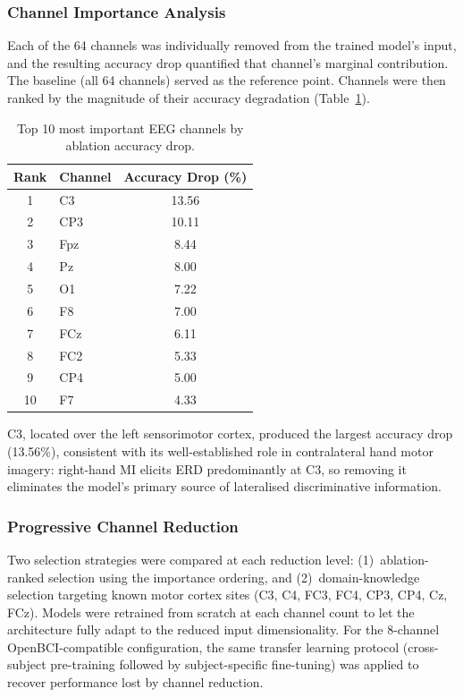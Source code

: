 \documentclass[12pt, a4paper]{article}
\begin{document}
\subsubsection{Channel Importance Analysis}

Each of the 64 channels was individually removed from the trained model's input, and the resulting accuracy drop quantified that channel's marginal contribution. The baseline (all 64 channels) served as the reference point. Channels were then ranked by the magnitude of their accuracy degradation (Table~\ref{tab:channel_importance}).

\begin{table}[htbp]
\centering
\caption{Top 10 most important EEG channels by ablation accuracy drop.}
\label{tab:channel_importance}
\begin{tabular}{clc}
\toprule
\textbf{Rank} & \textbf{Channel} & \textbf{Accuracy Drop (\%)} \\
\midrule
1 & C3   & 13.56 \\
2 & CP3  & 10.11 \\
3 & Fpz  & 8.44 \\
4 & Pz   & 8.00 \\
5 & O1   & 7.22 \\
6 & F8   & 7.00 \\
7 & FCz  & 6.11 \\
8 & FC2  & 5.33 \\
9 & CP4  & 5.00 \\
10 & F7  & 4.33 \\
\bottomrule
\end{tabular}
\end{table}

C3, located over the left sensorimotor cortex, produced the largest accuracy drop (13.56\%), consistent with its well-established role in contralateral hand motor imagery: right-hand MI elicits ERD predominantly at C3, so removing it eliminates the model's primary source of lateralised discriminative information.

\subsubsection{Progressive Channel Reduction}

Two selection strategies were compared at each reduction level: (1)~ablation-ranked selection using the importance ordering, and (2)~domain-knowledge selection targeting known motor cortex sites (C3, C4, FC3, FC4, CP3, CP4, Cz, FCz). Models were retrained from scratch at each channel count to let the architecture fully adapt to the reduced input dimensionality. For the 8-channel OpenBCI-compatible configuration, the same transfer learning protocol (cross-subject pre-training followed by subject-specific fine-tuning) was applied to recover performance lost by channel reduction.
\end{document}
